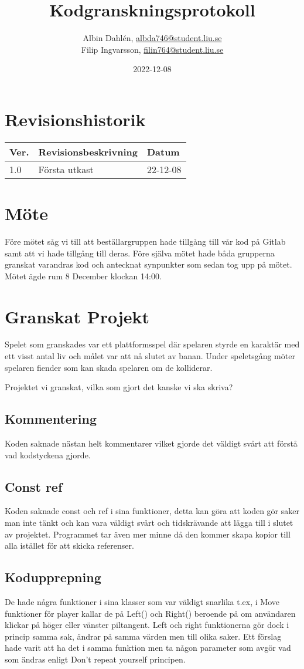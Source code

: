 \documentclass{TDP005mall}
\author{Albin Dahlén, \url{albda746@student.liu.se}\\
  Filip Ingvarsson, \url{filin764@student.liu.se}}
\title{Kodgranskningsprotokoll}
\date{2022-12-08}
\begin{document}
\projectpage
\section{Revisionshistorik}
\begin{table}[!h]
\begin{tabularx}{\linewidth}{|l|X|l|}
\hline
Ver. & Revisionsbeskrivning & Datum \\\hline
1.0 & Första utkast & 22-12-08 \\\hline
\end{tabularx}
\end{table}

\section{Möte}
Före mötet såg vi till att beställargruppen hade tillgång till vår kod på Gitlab samt att vi hade tillgång till deras.
Före själva mötet hade båda grupperna granskat varandras kod och antecknat synpunkter som sedan tog upp på mötet.
Mötet ägde rum 8 December klockan 14:00.

\section{Granskat Projekt}
Spelet som granskades var ett plattformsspel där spelaren styrde en karaktär med ett visst antal liv och målet var att nå slutet av banan.
Under speletsgång möter spelaren fiender som kan skada spelaren om de kolliderar.

Projektet vi granskat, vilka som gjort det kanske vi ska skriva?

\subsection{Kommentering}
Koden saknade nästan helt kommentarer vilket gjorde det väldigt svårt att förstå vad kodstyckena gjorde.


\subsection{Const ref}
Koden saknade const och ref i sina funktioner, detta kan göra att koden gör saker man inte tänkt och kan vara väldigt svårt och tidskrävande att lägga till i slutet av projektet. Programmet tar även mer minne då den kommer skapa kopior till alla istället för att skicka referenser.

\subsection{Kodupprepning}
De hade några funktioner i sina klasser som var väldigt snarlika t.ex, i Move funktioner för player kallar de på Left() och Right() beroende på om användaren klickar på höger eller vänster piltangent. Left och right funktionerna gör dock i princip samma sak, ändrar på samma värden men till olika saker. Ett förslag hade varit att ha det i samma funktion men ta någon parameter som avgör vad som ändras enligt Don't repeat yourself principen.
\end{document}
